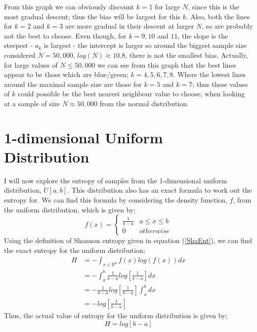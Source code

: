 \documentclass{report}
\begin{document}
From this graph we can obviously discount $k=1$ for large $N$, since this is the most gradual descent; thus the bias will be largest for this $k$. Also, both the lines for $k=2$ and $k=3$ are more gradual in their descent at larger $N$, so are probably not the best to choose. Even though, for $k=9, 10$ and $11$, the slope is the steepest - $a_{k}$ is largest - the intercept is larger so around the biggest sample size considered $N=50,000$, $log(N) \approx 10.8$, there is not the smallest bias. Actually, for large values of $N \leq 50,000$ we can see from this graph that the best lines appear to be those which are blue/green; $k = 4, 5, 6, 7, 8$. Where the lowest lines around the maximal sample size are those for $k=5$ and $k=7$; thus these values of $k$ could possible be the best nearest neighbour value to choose, when looking at a sample of size $N \approx 50,000$ from the normal distribution.



















\section{1-dimensional Uniform Distribution} \label{Uniform_d=1}

I will now explore the entropy of samples from the 1-dimensional uniform distribution, $U[a, b]$. This distribution also has an exact formula to work out the entropy for. We can find this formula by considering the density function, $f$, from the uniform distribution, which is given by;
\[
f(x) =  \begin{cases} 
      \frac{1}{b-a} & a \leq x \leq b \\
      0 & otherwise
   \end{cases}
\]
Using the definition of Shannon entropy given in equation (\ref{ShaEnt}), we can find the exact entropy for the uniform distribution;
\begin{align*}
H &= - \int_{x \in \mathbb{R}^d} f(x) log(f(x)) dx \\ 
&= - \int_{a}^{b} \frac{1}{b-a} log \left[ \frac{1}{b-a} \right] dx  \\
&= - \frac{1}{b-a} log \left[ \frac{1}{b-a} \right]  \int_{a}^{b} dx  \\
&= -  log  \left[ \frac{1}{b-a} \right] 
\end{align*}
Thus, the actual value of entropy for the uniform distribution is given by;
\begin{equation} \label{UnifEnt}
H = log [ b-a ]
\end{equation}
\end{document}
